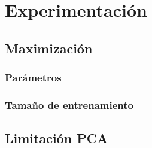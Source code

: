 \documentclass[../main.tex]{subfiles}
\begin{document}
\section{Experimentación} 

\subsection{Maximización}

\subsubsection{Parámetros}


\subsubsection{Tamaño de entrenamiento}


\subsection{Limitación PCA}

\end{document}
